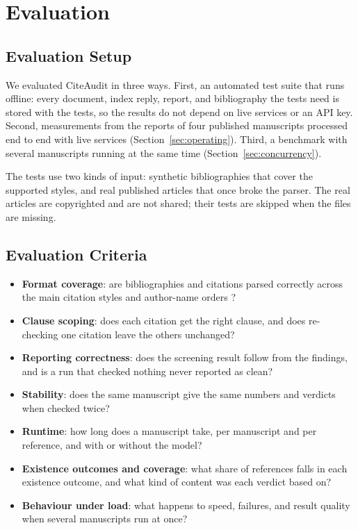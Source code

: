 \documentclass{article}
\begin{document}
\section{Evaluation}
\label{sec:eval}

\subsection{Evaluation Setup}

We evaluated CiteAudit in three ways. First, an automated test suite that runs offline: every document, index reply, report, and bibliography the tests need is stored with the tests, so the results do not depend on live services or an API key. Second, measurements from the reports of four published manuscripts processed end to end with live services (Section~\ref{sec:operating}). Third, a benchmark with several manuscripts running at the same time (Section~\ref{sec:concurrency}).

The tests use two kinds of input: synthetic bibliographies that cover the supported styles, and real published articles that once broke the parser. The real articles are copyrighted and are not shared; their tests are skipped when the files are missing.

\subsection{Evaluation Criteria}

\begin{itemize}

\item \textbf{Format coverage}: are bibliographies and citations parsed correctly across the main citation styles and author-name orders \cite{lopez2009,tkaczyk2015}?

\item \textbf{Clause scoping}: does each citation get the right clause, and does re-checking one citation leave the others unchanged?

\item \textbf{Reporting correctness}: does the screening result follow from the findings, and is a run that checked nothing never reported as clean?

\item \textbf{Stability}: does the same manuscript give the same numbers and verdicts when checked twice?

\item \textbf{Runtime}: how long does a manuscript take, per manuscript and per reference, and with or without the model?

\item \textbf{Existence outcomes and coverage}: what share of references falls in each existence outcome, and what kind of content was each verdict based on?

\item \textbf{Behaviour under load}: what happens to speed, failures, and result quality when several manuscripts run at once?

\end{itemize}
\end{document}
